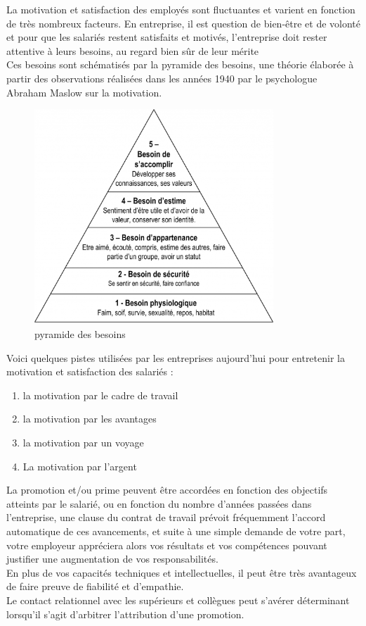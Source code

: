 La motivation et satisfaction des employés sont fluctuantes et varient en fonction de très nombreux facteurs. En entreprise, il est question de bien-être et de volonté et pour que les salariés restent satisfaits et motivés, l’entreprise doit rester attentive à leurs besoins, au regard bien sûr de leur mérite\\
Ces besoins sont schématisés par la pyramide des besoins, une théorie élaborée à partir des observations réalisées dans les années 1940 par le psychologue Abraham Maslow sur la motivation. 

\begin{figure}[!ht]
\begin{center}
\includegraphics[width=9cm]{introduction/schema_introduction}
\end{center}
\caption{pyramide des besoins}
\end{figure}

\newpage

Voici quelques pistes utilisées par les entreprises aujourd’hui pour entretenir la motivation et satisfaction des salariés :
\begin{enumerate}
\item la motivation par le cadre de travail
\item la motivation par les avantages
\item la motivation par un voyage
\item La motivation par l’argent \\
\end{enumerate}

La promotion et/ou prime  peuvent être accordées en fonction des objectifs atteints par le salarié, ou en fonction du nombre d'années passées dans l'entreprise, une clause du contrat de travail prévoit fréquemment l'accord automatique de ces avancements, et suite à une simple demande de votre part, votre employeur appréciera alors vos résultats et vos compétences pouvant justifier une augmentation de vos responsabilités.\\
En plus de vos capacités techniques et intellectuelles, il peut être très avantageux de faire preuve de fiabilité et d'empathie.\\ Le contact relationnel avec les supérieurs et collègues peut s'avérer déterminant lorsqu'il s'agit d'arbitrer l'attribution d'une promotion.\\

